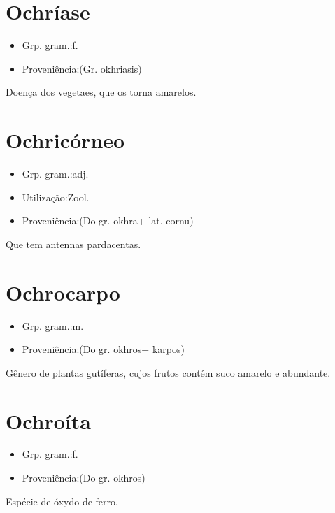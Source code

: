 \section{Ochríase}
\begin{itemize}
\item {Grp. gram.:f.}
\end{itemize}
\begin{itemize}
\item {Proveniência:(Gr. \textunderscore okhriasis\textunderscore )}
\end{itemize}
Doença dos vegetaes, que os torna amarelos.
\section{Ochricórneo}
\begin{itemize}
\item {Grp. gram.:adj.}
\end{itemize}
\begin{itemize}
\item {Utilização:Zool.}
\end{itemize}
\begin{itemize}
\item {Proveniência:(Do gr. \textunderscore okhra\textunderscore  + lat. \textunderscore cornu\textunderscore )}
\end{itemize}
Que tem antennas pardacentas.
\section{Ochrocarpo}
\begin{itemize}
\item {Grp. gram.:m.}
\end{itemize}
\begin{itemize}
\item {Proveniência:(Do gr. \textunderscore okhros\textunderscore  + \textunderscore karpos\textunderscore )}
\end{itemize}
Gênero de plantas gutíferas, cujos frutos contém suco amarelo e abundante.
\section{Ochroíta}
\begin{itemize}
\item {Grp. gram.:f.}
\end{itemize}
\begin{itemize}
\item {Proveniência:(Do gr. \textunderscore okhros\textunderscore )}
\end{itemize}
Espécie de óxydo de ferro.
